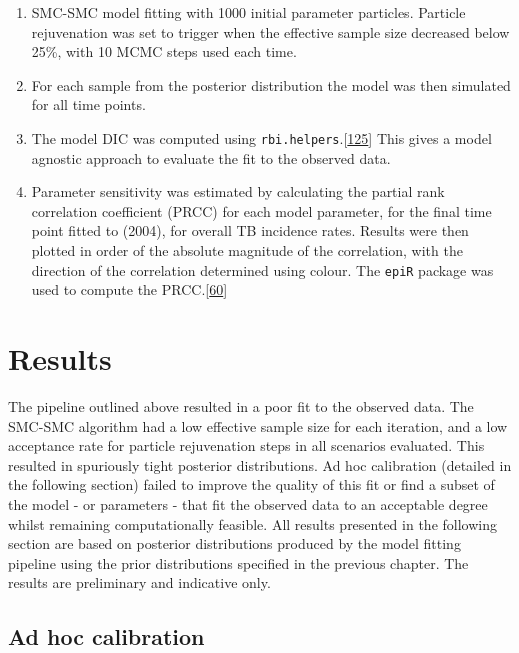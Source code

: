 \documentclass[11pt,twoside]{bristolthesis}
\begin{document}
\begin{enumerate}
  \item
    SMC-SMC model fitting with 1000 initial parameter particles. Particle rejuvenation was set to trigger when the effective sample size decreased below 25\%, with 10 MCMC steps used each time.
  \item
    For each sample from the posterior distribution the model was then simulated for all time points.
  \item
    The model DIC was computed using \texttt{rbi.helpers}.{[}\protect\hyperlink{ref-Funk:2019uw}{125}{]} This gives a model agnostic approach to evaluate the fit to the observed data.
  \item
    Parameter sensitivity was estimated by calculating the partial rank correlation coefficient (PRCC) for each model parameter, for the final time point fitted to (2004), for overall TB incidence rates. Results were then plotted in order of the absolute magnitude of the correlation, with the direction of the correlation determined using colour. The \texttt{epiR} package was used to compute the PRCC.{[}\protect\hyperlink{ref-EpiR}{60}{]}
  \end{enumerate}
  \hypertarget{results-3}{%
  \section{Results}\label{results-3}}
  
  The pipeline outlined above resulted in a poor fit to the observed data. The SMC-SMC algorithm had a low effective sample size for each iteration, and a low acceptance rate for particle rejuvenation steps in all scenarios evaluated. This resulted in spuriously tight posterior distributions. Ad hoc calibration (detailed in the following section) failed to improve the quality of this fit or find a subset of the model - or parameters - that fit the observed data to an acceptable degree whilst remaining computationally feasible. All results presented in the following section are based on posterior distributions produced by the model fitting pipeline using the prior distributions specified in the previous chapter. The results are preliminary and indicative only.
  
  \hypertarget{ad-hoc-calibration}{%
  \subsection{Ad hoc calibration}\label{ad-hoc-calibration}}
  
\end{document}
